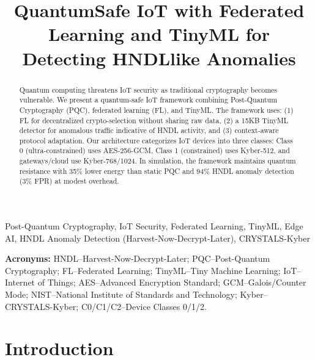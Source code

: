 \documentclass[conference]{IEEEtran}
\begin{document}
\title{Quantum\textendash Safe IoT with Federated Learning and TinyML for Detecting HNDL\textendash like Anomalies}

\author{
}

\maketitle

\begin{abstract}
Quantum computing threatens IoT security as traditional cryptography becomes vulnerable. We present a quantum-safe IoT framework combining Post-Quantum Cryptography (PQC), federated learning (FL), and TinyML. The framework uses: (1) FL for decentralized crypto-selection without sharing raw data, (2) a 15KB TinyML detector for anomalous traffic indicative of HNDL activity, and (3) context-aware protocol adaptation. Our architecture categorizes IoT devices into three classes: Class 0 (ultra-constrained) uses AES-256-GCM, Class 1 (constrained) uses Kyber-512, and gateways/cloud use Kyber-768/1024. In simulation, the framework maintains quantum resistance with 35\% lower energy than static PQC and 94\% HNDL anomaly detection (3\% FPR) at modest overhead.
\end{abstract}

\begin{IEEEkeywords}
Post-Quantum Cryptography, IoT Security, Federated Learning, TinyML, Edge AI, HNDL Anomaly Detection (Harvest-Now-Decrypt-Later), CRYSTALS-Kyber
\end{IEEEkeywords}

\noindent\textbf{Acronyms:} HNDL--Harvest-Now-Decrypt-Later; PQC--Post-Quantum Cryptography; FL--Federated Learning; TinyML--Tiny Machine Learning; IoT--Internet of Things; AES--Advanced Encryption Standard; GCM--Galois/Counter Mode; NIST--National Institute of Standards and Technology; Kyber--CRYSTALS-Kyber; C0/C1/C2--Device Classes 0/1/2.

\section{Introduction}
\end{document}
